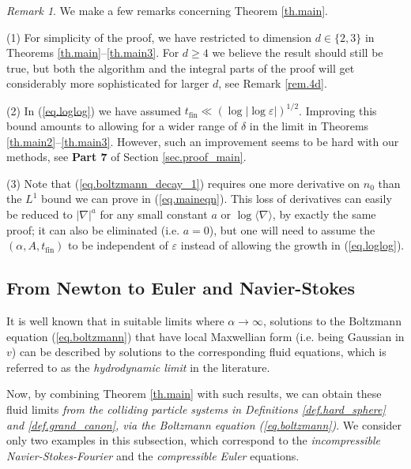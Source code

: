 \documentclass[10pt, reqno]{amsart}
\theoremstyle{definition}
\theoremstyle{remark}
\newtheorem{remark}[theorem]{Remark}
\numberwithin{equation}{section}
\begin{document}
\begin{remark} We make a few remarks concerning Theorem \ref{th.main}.

(1) For simplicity of the proof, we have restricted to dimension $d\in\{2,3\}$ in Theorems \ref{th.main}--\ref{th.main3}. For $d\geq 4$ we believe the result should still be true, but both the algorithm and the integral parts of the proof will get considerably more sophisticated for larger $d$, see Remark \ref{rem.4d}.

(2) In (\ref{eq.loglog}) we have assumed $t_{\mathrm{fin}}\ll(\log|\log\varepsilon|)^{1/2}$. Improving this bound amounts to allowing for a wider range of $\delta$ in the limit in Theorems \ref{th.main2}--\ref{th.main3}. However, such an improvement seems to be hard with our methods, see \textbf{Part 7} of Section \ref{sec.proof_main}.

(3) Note that (\ref{eq.boltzmann_decay_1}) requires one more derivative on $n_0$ than the $L^1$ bound we can prove in (\ref{eq.maineqn}). This loss of derivatives can easily be reduced to $|\nabla|^a$ for any small constant $a$ or $\log\langle \nabla\rangle$, by exactly the same proof; it can also be eliminated (i.e. $a=0$), but one will need to assume the $(\alpha,A,t_{\mathrm{fin}})$ to be independent of $\varepsilon$ instead of allowing the growth in (\ref{eq.loglog}).
\end{remark}
\subsection{From Newton to Euler and Navier-Stokes} It is well known \cite{Caf80,DEL89,GT20,GSR04} that in suitable limits where $\alpha\to\infty$, solutions to the Boltzmann equation (\ref{eq.boltzmann}) that have local Maxwellian form (i.e. being Gaussian in $v$) can be described by solutions to the corresponding fluid equations, which is referred to as the \emph{hydrodynamic limit} in the literature.

Now, by combining Theorem \ref{th.main} with such results, we can obtain these fluid limits \emph{from the colliding particle systems in Definitions \ref{def.hard_sphere} and \ref{def.grand_canon}, via the Boltzmann equation (\ref{eq.boltzmann})}. We consider only two examples in this subsection, which correspond to the \emph{incompressible Navier-Stokes-Fourier} and the \emph{compressible Euler} equations.
\end{document}
